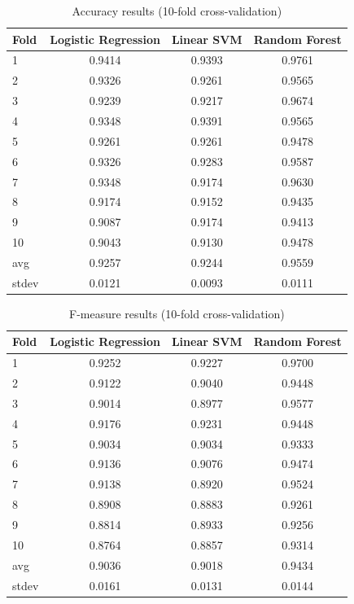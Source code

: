 \documentclass[conference]{IEEEtran}
\begin{document}
\begin{table}[t]
\centering
\caption{Accuracy results (10-fold cross-validation)}
\label{tab:accuracy}
\begin{tabular}{@{}lccc@{}}
\toprule
Fold & Logistic Regression & Linear SVM & Random Forest \\
\midrule
1  & 0.9414 & 0.9393 & 0.9761 \\
2  & 0.9326 & 0.9261 & 0.9565 \\
3  & 0.9239 & 0.9217 & 0.9674 \\
4  & 0.9348 & 0.9391 & 0.9565 \\
5  & 0.9261 & 0.9261 & 0.9478 \\
6  & 0.9326 & 0.9283 & 0.9587 \\
7  & 0.9348 & 0.9174 & 0.9630 \\
8  & 0.9174 & 0.9152 & 0.9435 \\
9  & 0.9087 & 0.9174 & 0.9413 \\
10 & 0.9043 & 0.9130 & 0.9478 \\
avg   & 0.9257 & 0.9244 & 0.9559 \\
stdev & 0.0121 & 0.0093 & 0.0111 \\
\bottomrule
\end{tabular}
\end{table}

\begin{table}[t]
\centering
\caption{F-measure results (10-fold cross-validation)}
\label{tab:fmeasure}
\begin{tabular}{@{}lccc@{}}
\toprule
Fold & Logistic Regression & Linear SVM & Random Forest \\
\midrule
1 & 0.9252 & 0.9227 & 0.9700 \\
2 & 0.9122 & 0.9040 & 0.9448 \\
3 & 0.9014 & 0.8977 & 0.9577 \\
4 & 0.9176 & 0.9231 & 0.9448 \\
5 & 0.9034 & 0.9034 & 0.9333 \\
6 & 0.9136 & 0.9076 & 0.9474 \\
7 & 0.9138 & 0.8920 & 0.9524 \\
8 & 0.8908 & 0.8883 & 0.9261 \\
9 & 0.8814 & 0.8933 & 0.9256 \\
10 & 0.8764 & 0.8857 & 0.9314 \\
avg & 0.9036 & 0.9018 & 0.9434 \\
stdev & 0.0161 & 0.0131 & 0.0144 \\
\bottomrule
\end{tabular}
\end{table}
\end{document}

